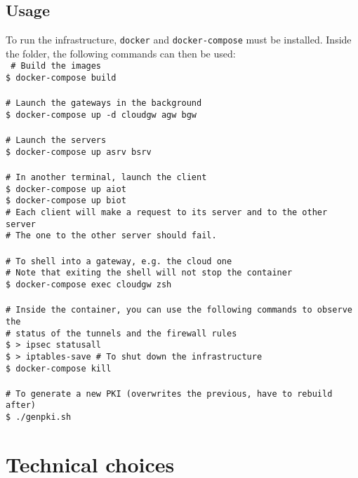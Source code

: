 \documentclass[paper=a4, fontsize=11pt]{scrartcl}
\begin{document}
\subsection{Usage}

To run the infrastructure, \texttt{docker} and \texttt{docker-compose} must be
installed.
Inside the folder, the following commands can then be used:\\
\texttt{%
    \# Build the images \\
    \$ docker-compose build
    \\ \\
    \# Launch the gateways in the background \\
    \$ docker-compose up -d cloudgw agw bgw
    \\ \\
    \# Launch the servers \\
    \$ docker-compose up asrv bsrv
    \\ \\
    \# In another terminal, launch the client \\
    \$ docker-compose up aiot \\
    \$ docker-compose up biot \\
    \# Each client will make a request to its server and to the other server \\
    \# The one to the other server should fail.
    \\ \\
    \# To shell into a gateway, e.g.\ the cloud one \\
    \# Note that exiting the shell will not stop the container \\
    \$ docker-compose exec cloudgw zsh
    \\ \\
    \# Inside the container, you can use the following commands to observe the \\
    \# status of the tunnels and the firewall rules \\
    \$ > ipsec statusall \\
    \$ > iptables-save
    \# To shut down the infrastructure \\
    \$ docker-compose kill
    \\ \\
    \# To generate a new PKI (overwrites the previous, have to rebuild after) \\
    \$~./genpki.sh
}

\section{Technical choices}
\end{document}
